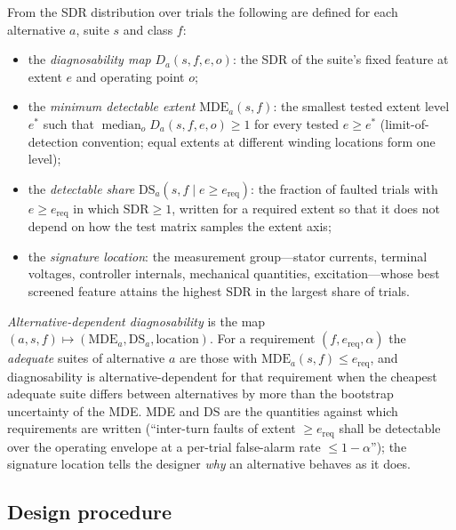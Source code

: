 From the SDR distribution over trials the following are defined for each alternative $a$, suite $s$ and class $f$:
\begin{itemize}
  \item the \emph{diagnosability map} $D_a(s,f,e,o)$: the SDR of the suite's fixed feature at extent $e$ and operating point $o$;
  \item the \emph{minimum detectable extent} $\mathrm{MDE}_a(s,f)$: the smallest tested extent level $e^\ast$ such that $\operatorname{median}_o D_a(s,f,e,o)\ge1$ for every tested $e\ge e^\ast$ (limit-of-detection convention; equal extents at different winding locations form one level);
  \item the \emph{detectable share} $\mathrm{DS}_a(s,f\mid e\ge e_{\mathrm{req}})$: the fraction of faulted trials with $e\ge e_{\mathrm{req}}$ in which $\mathrm{SDR}\ge1$, written for a required extent so that it does not depend on how the test matrix samples the extent axis;
  \item the \emph{signature location}: the measurement group---stator currents, terminal voltages, controller internals, mechanical quantities, excitation---whose best screened feature attains the highest SDR in the largest share of trials.
\end{itemize}
\emph{Alternative-dependent diagnosability} is the map $(a, s, f)\mapsto(\mathrm{MDE}_a, \mathrm{DS}_a, \text{location})$. For a requirement $(f, e_{\mathrm{req}}, \alpha)$ the \emph{adequate} suites of alternative $a$ are those with $\mathrm{MDE}_a(s,f)\le e_{\mathrm{req}}$, and diagnosability is alternative-dependent for that requirement when the cheapest adequate suite differs between alternatives by more than the bootstrap uncertainty of the MDE. MDE and DS are the quantities against which requirements are written (``inter-turn faults of extent $\ge e_{\mathrm{req}}$ shall be detectable over the operating envelope at a per-trial false-alarm rate $\le1-\alpha$''); the signature location tells the designer \emph{why} an alternative behaves as it does.

\subsection{Design procedure}\label{sec:procedure}



